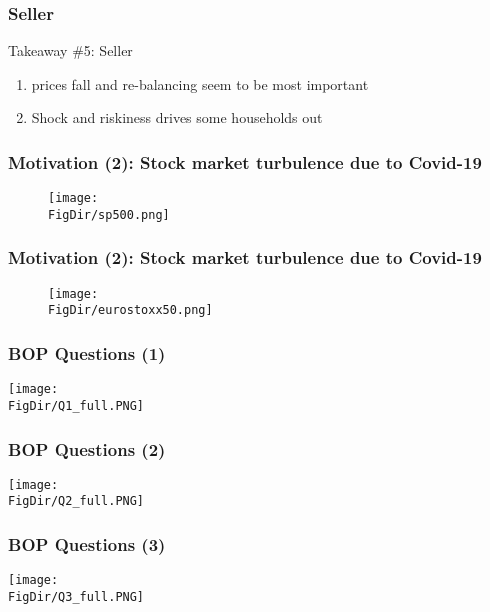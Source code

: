 \documentclass[pdflatex]{beamer}
\begin{document}
\begin{frame}[noframenumbering]
	\frametitle{Seller}
	\begin{block}{Takeaway \#5: Seller}
		{
			\begin{enumerate}
				\item prices fall and re-balancing seem to be most important
				\item Shock and riskiness drives some households out
			\end{enumerate}
		}
	\end{block}
	
\end{frame}

\begin{frame}[label = sp500, noframenumbering]
	\frametitle{Motivation (2): Stock market turbulence due to Covid-19}
	\begin{figure}
		\centering
		\texttt{[image: \\FigDir/sp500.png]}
	\end{figure}
	\hyperlink{motivation_2}{}
\end{frame}

\begin{frame}[label = eurostoxx50, noframenumbering]
	\frametitle{Motivation (2): Stock market turbulence due to Covid-19}
	\begin{figure}
		\centering
		\texttt{[image: \\FigDir/eurostoxx50.png]}
	\end{figure}
	\hyperlink{motivation_2}{}
\end{frame}


\begin{frame}[label = BOP Q1, noframenumbering]
	\frametitle{BOP Questions (1)}
	\hyperlink{Timeline}{}
	\centering
	\texttt{[image: \\FigDir/Q1\_full.PNG]}
\end{frame}

\begin{frame}[label = BOP Q2, noframenumbering]
	\frametitle{BOP Questions (2)}
	\hyperlink{Timeline}{}
	\centering
	\texttt{[image: \\FigDir/Q2\_full.PNG]}
\end{frame}

\begin{frame}[label = BOP Q3, noframenumbering]
	\frametitle{BOP Questions (3)}
	\hyperlink{Timeline}{}
	\centering
	\texttt{[image: \\FigDir/Q3\_full.PNG]}
\end{frame}
\end{document}
